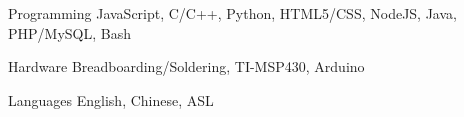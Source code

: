 


\begin{cvskills}


\cvskill
{Programming} %
{JavaScript, C/C++, Python, HTML5/CSS, NodeJS, Java,  PHP/MySQL, Bash} %


\cvskill
{Hardware} %
{Breadboarding/Soldering, TI-MSP430, Arduino} %


\cvskill
{Languages} %
{English, Chinese, ASL} %


\end{cvskills}